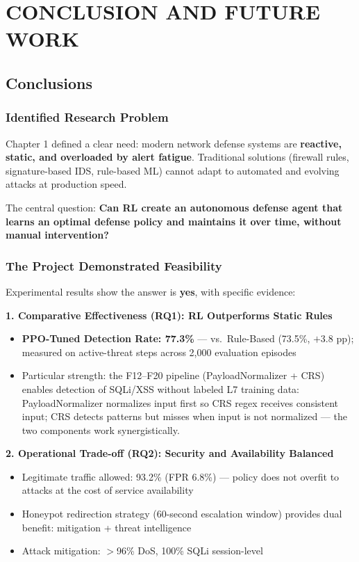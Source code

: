 \documentclass[12pt,a4paper]{report}
\begin{document}
\chapter{CONCLUSION AND FUTURE WORK}

\section{Conclusions}

\subsection{Identified Research Problem}

Chapter 1 defined a clear need: modern network defense systems are \textbf{reactive, static, and overloaded by alert fatigue}. Traditional solutions (firewall rules, signature-based IDS, rule-based ML) cannot adapt to automated and evolving attacks at production speed.

The central question: \textbf{Can RL create an autonomous defense agent that learns an optimal defense policy and maintains it over time, without manual intervention?}

\subsection{The Project Demonstrated Feasibility}

Experimental results show the answer is \textbf{yes}, with specific evidence:

\textbf{1. Comparative Effectiveness (RQ1): RL Outperforms Static Rules}
\begin{itemize}
  \item \textbf{PPO-Tuned Detection Rate: 77.3\%} --- vs.\ Rule-Based (73.5\%, $+$3.8 pp); measured on active-threat steps across 2,000 evaluation episodes
  \item Particular strength: the F12--F20 pipeline (PayloadNormalizer + CRS) enables detection of SQLi/XSS without labeled L7 training data: PayloadNormalizer normalizes input first so CRS regex receives consistent input; CRS detects patterns but misses when input is not normalized --- the two components work synergistically.
\end{itemize}

\textbf{2. Operational Trade-off (RQ2): Security and Availability Balanced}
\begin{itemize}
  \item Legitimate traffic allowed: 93.2\% (FPR 6.8\%) --- policy does not overfit to attacks at the cost of service availability
  \item Honeypot redirection strategy (60-second escalation window) provides dual benefit: mitigation + threat intelligence
  \item Attack mitigation: $>$96\% DoS, 100\% SQLi session-level
\end{itemize}
\end{document}
